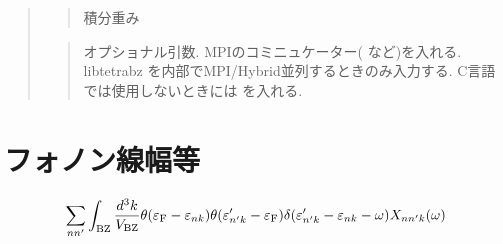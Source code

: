 \documentclass[letterpaper,10pt,dvipdfmx,openany]{sphinxmanual}
\begin{document}
\begin{quote}
\begin{quote}
\sphinxAtStartPar
積分重み
\end{quote}

\begin{sphinxVerbatim}[commandchars=\\\{\}]
\end{sphinxVerbatim}
\begin{quote}

\sphinxAtStartPar
オプショナル引数.
MPIのコミニュケーター(  など)を入れる.
libtetrabz を内部でMPI/Hybrid並列するときのみ入力する.
C言語では使用しないときには  を入れる.
\end{quote}
\end{quote}


\section{フォノン線幅等}
\label{\detokenize{routine:id6}}\begin{equation*}
\begin{split}\begin{align}
\sum_{n n'}
\int_{\rm BZ} \frac{d^3 k}{V_{\rm BZ}}
\theta(\varepsilon_{\rm F} -
\varepsilon_{n k}) \theta(\varepsilon'_{n' k} - \varepsilon_{\rm F})
\delta(\varepsilon'_{n' k} - \varepsilon_{n k} - \omega)
X_{n n' k}(\omega)
\end{align}\end{split}
\end{equation*}
\begin{sphinxVerbatim}[commandchars=\\\{\}]
\end{sphinxVerbatim}
\end{document}
